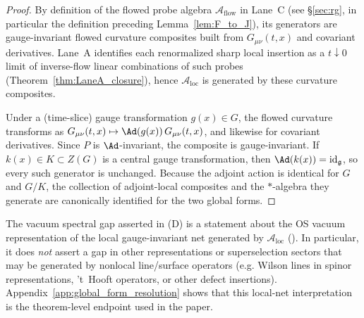 \begin{proof}
By definition of the flowed probe algebra $\mathcal A_{\mathrm{flow}}$ in Lane~C (see \S\ref{sec:rg}, in particular the definition preceding
Lemma~\ref{lem:F_to_J}), its generators are gauge-invariant flowed curvature composites built from $G_{\mu\nu}(t,x)$ and covariant derivatives.
Lane~A identifies each renormalized sharp local insertion as a $t\downarrow 0$ limit of inverse-flow linear combinations of such probes
(Theorem~\ref{thm:LaneA_closure}), hence $\mathcal A_{\mathrm{loc}}$ is generated by these curvature composites.

Under a (time-slice) gauge transformation $g(x)\in G$, the flowed curvature transforms as
$G_{\mu\nu}(t,x)\mapsto \Ad(g(x))\,G_{\mu\nu}(t,x)$, and likewise for covariant derivatives.
Since $P$ is $\Ad$-invariant, the composite is gauge-invariant.
If $k(x)\in K\subset Z(G)$ is a central gauge transformation, then $\Ad(k(x))=\mathrm{id}_{\mathfrak g}$, so every such generator is unchanged.
Because the adjoint action is identical for $G$ and $G/K$, the collection of adjoint-local composites and the $\ast$-algebra they generate
are canonically identified for the two global forms.
\end{proof}

\begin{corollary}
\label{cor:vacuum_gap_scope}
The vacuum spectral gap asserted in (D) is a statement about the OS vacuum representation
of the local gauge-invariant net generated by $\mathcal A_{\mathrm{loc}}$ ().
In particular, it does \emph{not} assert a gap in other representations or superselection sectors that may be generated
by nonlocal line/surface operators (e.g. Wilson lines in spinor representations, 't~Hooft operators, or other defect insertions).
Appendix~\ref{app:global_form_resolution} shows that this local-net interpretation is the theorem-level endpoint used in the paper.
\end{corollary}


